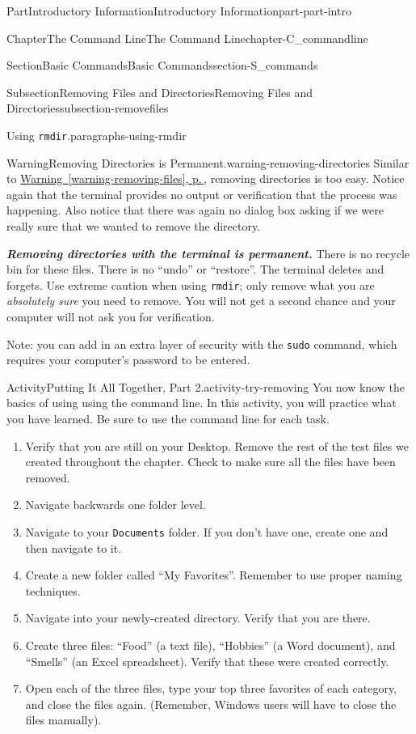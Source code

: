 \documentclass[twoside,10pt,]{book}
\newcommand{\xreffont}{\relax}
\newcommand{\mono}[1]{\texttt{#1}}
\newcommand{\alert}[1]{\textbf{\textit{#1}}}
\begin{document}
\begin{partptx}{Part}{Introductory Information}{}{Introductory Information}{}{}{part-part-intro}
\begin{chapterptx}{Chapter}{The Command Line}{}{The Command Line}{}{}{chapter-C_commandline}
\begin{sectionptx}{Section}{Basic Commands}{}{Basic Commands}{}{}{section-S_commands}
\begin{subsectionptx}{Subsection}{Removing Files and Directories}{}{Removing Files and Directories}{}{}{subsection-removefiles}
\begin{paragraphs}{Using \mono{rmdir}.}{paragraphs-using-rmdir}
\begin{warning}{Warning}{Removing Directories is Permanent.}{warning-removing-directories}
%
Similar to \hyperref[warning-removing-files]{Warning~{\xreffont\ref{warning-removing-files}}, p.\,\pageref{warning-removing-files}}, removing directories is too easy. Notice again that the terminal provides no output or verification that the process was happening. Also notice that there was again no dialog box asking if we were really sure that we wanted to remove the directory.%
\par
\alert{Removing directories with the terminal is permanent.} There is no recycle bin for these files. There is no ``undo'' or ``restore''. The terminal deletes and forgets. Use extreme caution when using \mono{rmdir}; only remove what you are \emph{absolutely sure} you need to remove. You will not get a second chance and your computer will not ask you for verification.%
\par
Note: you can add in an extra layer of security with the \mono{sudo} command, which requires your computer's password to be entered.%
\end{warning}
\end{paragraphs}%
\begin{activity}{Activity}{Putting It All Together, Part 2.}{activity-try-removing}%
%
You now know the basics of using using the command line. In this activity, you will practice what you have learned. Be sure to use the command line for each task.%
\begin{enumerate}[font=\bfseries,label=(\alph*),ref=\alph*]%
\item{}Verify that you are still on your Desktop. Remove the rest of the test files we created throughout the chapter. Check to make sure all the files have been removed.%
\item{}Navigate backwards one folder level.%
\item{}Navigate to your \mono{Documents} folder. If you don't have one, create one and then navigate to it.%
\item{}Create a new folder called ``My Favorites''. Remember to use proper naming techniques.%
\item{}Navigate into your newly-created directory. Verify that you are there.%
\item{}Create three files: ``Food'' (a text file), ``Hobbies'' (a Word document), and ``Smells'' (an Excel spreadsheet). Verify that these were created correctly.%
\item{}Open each of the three files, type your top three favorites of each category, and close the files again. (Remember, Windows users will have to close the files manually).%

\end{enumerate}
\end{activity}
\end{subsectionptx}
\end{sectionptx}
\end{chapterptx}
\end{partptx}
\end{document}
